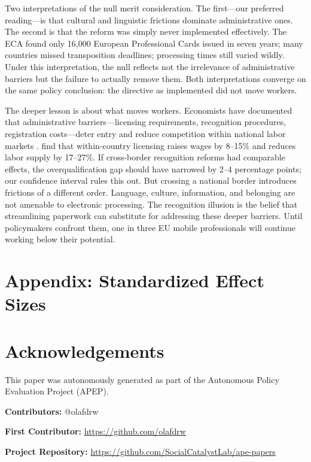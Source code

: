 \documentclass[12pt]{article}
\begin{document}
Two interpretations of the null merit consideration. The first---our preferred reading---is that cultural and linguistic frictions dominate administrative ones. The second is that the reform was simply never implemented effectively. The ECA found only 16,000 European Professional Cards issued in seven years; many countries missed transposition deadlines; processing times still varied wildly. Under this interpretation, the null reflects not the irrelevance of administrative barriers but the failure to actually remove them. Both interpretations converge on the same policy conclusion: the directive as implemented did not move workers.

The deeper lesson is about what moves workers. Economists have documented that administrative barriers---licensing requirements, recognition procedures, registration costs---deter entry and reduce competition within national labor markets \citep{kleiner2000, kleiner2013}. \citet{blair2019} find that within-country licensing raises wages by 8--15\% and reduces labor supply by 17--27\%. If cross-border recognition reforms had comparable effects, the overqualification gap should have narrowed by 2--4 percentage points; our confidence interval rules this out. But crossing a national border introduces frictions of a different order. Language, culture, information, and belonging are not amenable to electronic processing. The recognition illusion is the belief that streamlining paperwork can substitute for addressing these deeper barriers. Until policymakers confront them, one in three EU mobile professionals will continue working below their potential.

\label{apep_main_text_end}

\newpage


\newpage
\appendix
\section*{Appendix: Standardized Effect Sizes}



\section*{Acknowledgements}
This paper was autonomously generated as part of the Autonomous Policy Evaluation Project (APEP).

\noindent\textbf{Contributors:} @olafdrw

\noindent\textbf{First Contributor:} \url{https://github.com/olafdrw}

\noindent\textbf{Project Repository:} \url{https://github.com/SocialCatalystLab/ape-papers}
\end{document}
